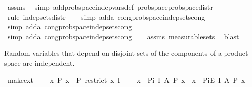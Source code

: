 \begin{isabellebody}
\ assms\ \isamarkupfalse%
\ {\isacharparenleft}{\kern0pt}simp\ add{\isacharcolon}{\kern0pt}prob{\isacharunderscore}{\kern0pt}space{\isachardot}{\kern0pt}indep{\isacharunderscore}{\kern0pt}vars{\isacharunderscore}{\kern0pt}def{}\ prob{\isacharunderscore}{\kern0pt}space{\isachardot}{\kern0pt}prob{\isacharunderscore}{\kern0pt}space{\isacharunderscore}{\kern0pt}distr{\isacharparenright}{\kern0pt}\isanewline
\ \ \ \isamarkupfalse%
\ {\isacharparenleft}{\kern0pt}rule\ indep{\isacharunderscore}{\kern0pt}sets{\isacharunderscore}{\kern0pt}distr{\isacharparenright}{\kern0pt}\isanewline
\ \ \isamarkupfalse%
\ {\isacharparenleft}{\kern0pt}simp\ add{\isacharcolon}{\kern0pt}a\ cong{\isacharcolon}{\kern0pt}prob{\isacharunderscore}{\kern0pt}space{\isachardot}{\kern0pt}indep{\isacharunderscore}{\kern0pt}sets{\isacharunderscore}{\kern0pt}cong{\isacharparenright}{\kern0pt}\isanewline
\ \ \isamarkupfalse%
\ {\isacharparenleft}{\kern0pt}simp\ add{\isacharcolon}{\kern0pt}a\ cong{\isacharcolon}{\kern0pt}prob{\isacharunderscore}{\kern0pt}space{\isachardot}{\kern0pt}indep{\isacharunderscore}{\kern0pt}sets{\isacharunderscore}{\kern0pt}cong{\isacharparenright}{\kern0pt}\isanewline
\ \ \ \isamarkupfalse%
\ {\isacharparenleft}{\kern0pt}simp\ add{\isacharcolon}{\kern0pt}a\ cong{\isacharcolon}{\kern0pt}prob{\isacharunderscore}{\kern0pt}space{\isachardot}{\kern0pt}indep{\isacharunderscore}{\kern0pt}sets{\isacharunderscore}{\kern0pt}cong{\isacharparenright}{\kern0pt}\isanewline
\ \ \isamarkupfalse%
\ assms{\isacharparenleft}{\kern0pt}{}{\isacharparenright}{\kern0pt}\ measurable{\isacharunderscore}{\kern0pt}sets\ \isamarkupfalse%
\ blast\isanewline
{}\isamarkupfalse%
%
\endisatagproof
{\isafoldproof}%
%
\isadelimproof
%
\endisadelimproof
%
\begin{isamarkuptext}%
Random variables that depend on disjoint sets of the components of a product space are
independent.%
\end{isamarkuptext}\isamarkuptrue%
\isamarkupfalse%
\ make{\isacharunderscore}{\kern0pt}ext{\isacharcolon}{\kern0pt}\ \isanewline
\ \ \ {\isachardoublequoteopen}{\isasymAnd}x{\isachardot}{\kern0pt}\ P\ x\ {\isacharequal}{\kern0pt}\ P\ {\isacharparenleft}{\kern0pt}restrict\ x\ I{\isacharparenright}{\kern0pt}{\isachardoublequoteclose}\ \isanewline
\ \ \ {\isachardoublequoteopen}{\isacharparenleft}{\kern0pt}{\isasymforall}x\ {\isasymin}\ Pi\ I\ A{\isachardot}{\kern0pt}\ P\ x{\isacharparenright}{\kern0pt}\ {\isacharequal}{\kern0pt}\ {\isacharparenleft}{\kern0pt}{\isasymforall}x\ {\isasymin}\ PiE\ I\ A{\isachardot}{\kern0pt}\ P\ x{\isacharparenright}{\kern0pt}{\isachardoublequoteclose}\isanewline

\end{isabellebody}

